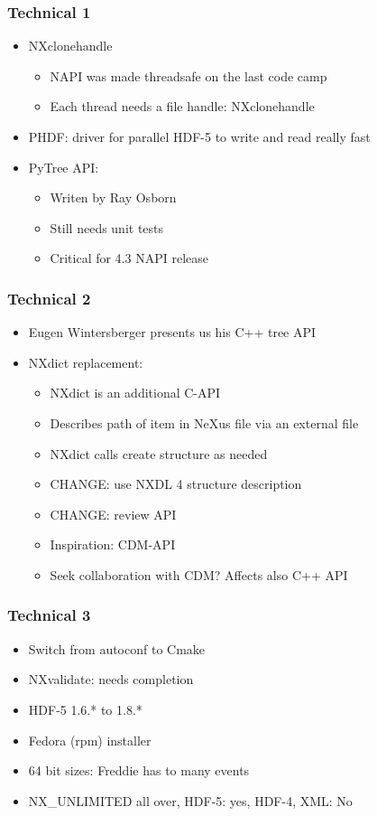 \documentclass{beamer}
\begin{document}
\begin{frame}
\frametitle{Technical 1}
\begin{itemize}
\item NXclonehandle
\begin{itemize}
\item NAPI was made threadsafe on the last code camp
\item Each thread needs a file handle: NXclonehandle
\end{itemize}
\item PHDF: driver for parallel HDF-5 to write and read really fast
\item PyTree API:
\begin{itemize}
\item Writen by Ray Osborn
\item Still needs unit tests
\item Critical for 4.3 NAPI release
\end{itemize}
\end{itemize}
\end{frame}

\begin{frame}
\frametitle{Technical 2}
\begin{itemize}
\item Eugen Wintersberger presents us his C++ tree API
\item NXdict replacement:
\begin{itemize}
\item NXdict is an additional C-API 
\item Describes path of item in NeXus file via an external file
\item NXdict calls create structure as needed 
\item CHANGE: use NXDL 4 structure description
\item CHANGE: review API
\item Inspiration: CDM-API
\item Seek collaboration with CDM? Affects also C++ API
\end{itemize}
\end{itemize}
\end{frame}

\begin{frame}
\frametitle{Technical 3}
\begin{itemize}
\item Switch from autoconf to Cmake
\item NXvalidate: needs completion
\item HDF-5 1.6.* to 1.8.*
\item Fedora (rpm) installer
\item 64 bit sizes: Freddie has to many events
\item NX\_UNLIMITED all over, HDF-5: yes, HDF-4, XML: No
\end{itemize}
\end{frame}
\end{document}
